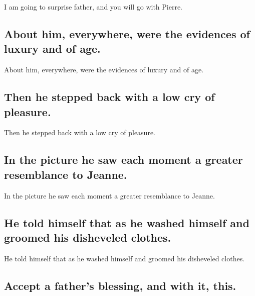 \documentclass[]{article}
\begin{document}
I am going to surprise father, and you will go with Pierre.

\hypertarget{about-him-everywhere-were-the-evidences-of-luxury-and-of-age.}{%
\subsection{About him, everywhere, were the evidences of luxury and of
age.}\label{about-him-everywhere-were-the-evidences-of-luxury-and-of-age.}}

About him, everywhere, were the evidences of luxury and of age.

\hypertarget{then-he-stepped-back-with-a-low-cry-of-pleasure.}{%
\subsection{Then he stepped back with a low cry of
pleasure.}\label{then-he-stepped-back-with-a-low-cry-of-pleasure.}}

Then he stepped back with a low cry of pleasure.

\hypertarget{in-the-picture-he-saw-each-moment-a-greater-resemblance-to-jeanne.}{%
\subsection{In the picture he saw each moment a greater resemblance to
Jeanne.}\label{in-the-picture-he-saw-each-moment-a-greater-resemblance-to-jeanne.}}

In the picture he saw each moment a greater resemblance to Jeanne.

\hypertarget{he-told-himself-that-as-he-washed-himself-and-groomed-his-disheveled-clothes.}{%
\subsection{He told himself that as he washed himself and groomed his
disheveled
clothes.}\label{he-told-himself-that-as-he-washed-himself-and-groomed-his-disheveled-clothes.}}

He told himself that as he washed himself and groomed his disheveled
clothes.

\hypertarget{accept-a-fathers-blessing-and-with-it-this.}{%
\subsection{Accept a father's blessing, and with it,
this.}\label{accept-a-fathers-blessing-and-with-it-this.}}
\end{document}

